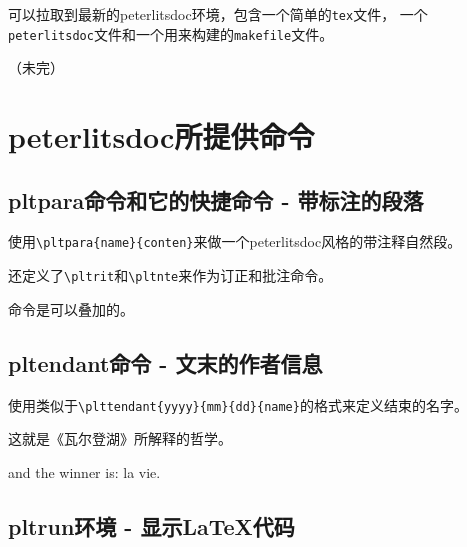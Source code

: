 \documentclass{peterlitsdoc}
\newcommand{\vb}{\verb}
\begin{document}
可以拉取到最新的peterlitsdoc环境，包含一个简单的\vb|tex|文件，
一个\vb|peterlitsdoc|文件和一个用来构建的\vb|makefile|文件。

（未完）


\section{peterlitsdoc所提供命令}


\subsection{pltpara命令和它的快捷命令 - 带标注的段落}

使用\vb|\pltpara{name}{conten}|来做一个peterlitsdoc风格的带注释自然段。
\begin{pltrun}
\end{pltrun}

还定义了\vb|\pltrit|和\verb|\pltnte|来作为订正和批注命令。
\begin{pltrun}
\end{pltrun}

命令是可以叠加的。
\begin{pltrun}
\end{pltrun}


\subsection{pltendant命令 - 文末的作者信息}

使用类似于\vb|\plttendant{yyyy}{mm}{dd}{name}|的格式来定义结束的名字。
\begin{pltrun}
这就是《瓦尔登湖》所解释的哲学。

and the winner is: la vie.

\end{pltrun}


\subsection{pltrun环境 - 显示\LaTeX{}代码}
\end{document}
